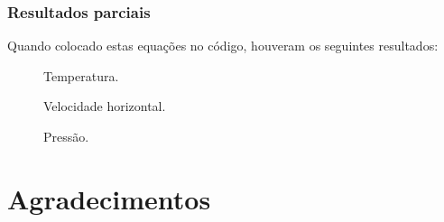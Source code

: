 \documentclass[xcolor=dvipsnames,10pt,aspectratio=169]{beamer}
\begin{document}
	\begin{frame}
		\frametitle{Resultados parciais}
		Quando colocado estas equações no código, houveram os seguintes resultados:\\
		\vspace{1cm}
		\begin{minipage}[h!]{0.31\textwidth}
			\begin{figure}
				\label{gif1}
				\caption{Temperatura.}
			\end{figure}
		\end{minipage}
		\begin{minipage}[h!]{0.31\textwidth}
			\begin{figure}
				\label{gif2}
				\caption{Velocidade horizontal.}
			\end{figure}
		\end{minipage}
		\begin{minipage}[h!]{0.31\textwidth}
			\begin{figure}
				\label{gif3}
				\caption{Pressão.}
			\end{figure}
		\end{minipage}
	
	\end{frame}





\section{Agradecimentos}
			
\end{document}
